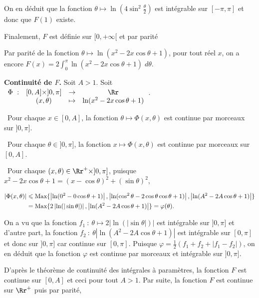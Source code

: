 {\begin{enumerate}
{On en déduit que la fonction $\theta\mapsto\ln\left(4\sin^2\frac{\theta}{2}\right)$ est intégrable sur $[-\pi,\pi]$ et donc que $F(1)$ existe.

Finalement, $F$ est définie sur $[0,+\infty[$ et par parité

\begin{center}
\end{center}

 Par parité de la fonction $\theta\mapsto\ln(x^2-2x\cos\theta+1)$, pour tout réel $x$, on a encore $F(x)=2\int_{0}^{\pi}\ln(x^2-2x\cos\theta+1)\;d\theta$.

\textbf{Continuité de $F$.} Soit $A>1$. Soit $\begin{array}[t]{cccc}
\Phi~:&[0,A]\times]0,\pi]&\rightarrow&\Rr\\
 &(x,\theta)&\mapsto&\ln(x^2-2x\cos\theta+1)
\end{array}$.

\textbullet~Pour chaque $x\in[0,A]$, la fonction $\theta\mapsto\Phi(x,\theta)$ est continue par morceaux sur $]0,\pi]$.

\textbullet~Pour chaque $\theta\in]0,\pi]$, la fonction $x\mapsto\Phi(x,\theta)$ est continue par morceaux sur $[0,A]$.

\textbullet~Pour chaque $(x,\theta)\in\Rr^+\times]0,\pi]$, puisque $x^2-2x\cos\theta+1=(x-\cos\theta)^2+(\sin\theta)^2$,

\begin{align*}\ensuremath
|\Phi(x,\theta)|&\leqslant\text{Max}\{\left|\ln(0^2-0\cos\theta+1)\right|,\left|\ln(\cos^2\theta-2\cos\theta\cos\theta+1)\right|,\left|\ln(A^2-2A\cos\theta+1)\right|\}\\
 &=\text{Max}\{2\left|\ln(|\sin\theta|)\right|,\left|\ln(A^2-2A\cos\theta+1)\right|\}=\varphi(\theta).
\end{align*}

On a vu que la fonction $f_1~:~\theta\mapsto2\left|\ln(|\sin\theta|)\right|$ est intégrable sur $]0,\pi]$ et d'autre part, la fonction $f_2~:~\theta\left|\ln(A^2-2A\cos\theta+1)\right|$ est intégrable sur $[0,\pi]$ et donc sur $]0,\pi]$ car continue sur $[0,\pi]$. Puisque $\varphi=\frac{1}{2}(f_1+f_2+|f_1-f_2|)$, on en déduit que la fonction $\varphi$ est continue par morceaux et intégrable sur $]0,\pi]$.

D'après le théorème de continuité des intégrales à paramètres, la fonction $F$ est continue sur $[0,A]$ et ceci pour tout $A>1$. Par suite, la fonction $F$ est continue sur $\Rr^+$ puis par parité,

}
\end{enumerate}}
